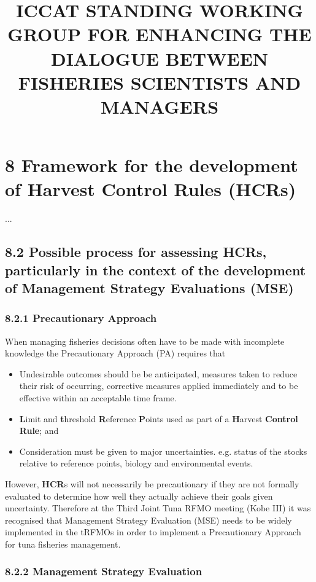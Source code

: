 \documentclass[a4paper,10pt]{article}
\title{ICCAT STANDING WORKING GROUP FOR ENHANCING THE DIALOGUE BETWEEN FISHERIES SCIENTISTS AND MANAGERS}
\author{}
\date{}
\begin{document}
\maketitle

\section*{8  Framework for the development of Harvest Control Rules (HCRs)}

...


\subsection*{8.2 Possible process for assessing HCRs, particularly in the context of the development of Management Strategy Evaluations (MSE)}


\subsubsection*{8.2.1 Precautionary Approach}

When managing fisheries decisions often have to be  made with incomplete knowledge the Precautionary Approach (PA) requires that
  \begin{itemize}
     \item Undesirable outcomes should be be anticipated, measures taken to reduce their risk of occurring, corrective measures applied 
     immediately and to be effective within an acceptable time frame. 
     \item \textbf{L}imit and \textbf{t}hreshold \textbf{R}eference \textbf{P}oints used as part of a \textbf{H}arvest \textbf{Control} \textbf{Rule}; and
     \item Consideration must be given to major uncertainties. e.g. status of the stocks relative to reference
points, biology and environmental events.
   \end{itemize}
 
 However, \textbf{HCR}s will not necessarily be precautionary if they are not formally evaluated to determine 
    how well they actually achieve their goals given uncertainty. Therefore at the Third Joint Tuna RFMO meeting (Kobe III) 
    it was recognised that Management Strategy Evaluation (MSE) needs to be widely implemented in the tRFMOs in order to 
    implement a Precautionary Approach for tuna fisheries management. 
 
\subsubsection*{8.2.2 Management Strategy Evaluation}
\end{document}
